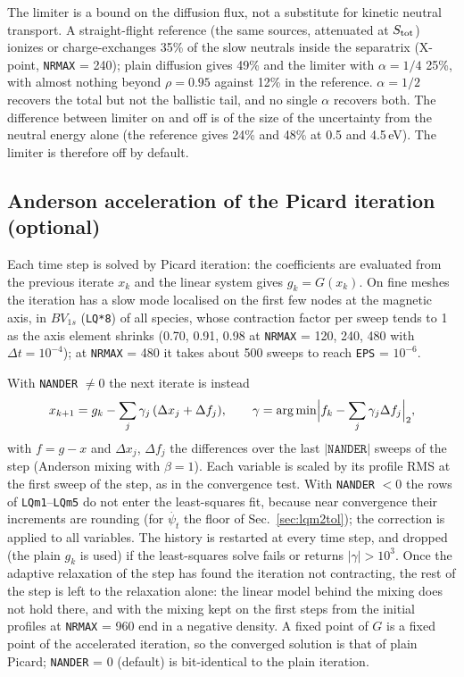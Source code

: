 \documentclass[11pt]{article}
\def\r#1{{\rm#1}}
\def\psit{\psi_t}
\def\psitd{\dot{\psit}}
\begin{document}
The limiter is a bound on the diffusion flux, not a substitute for kinetic
neutral transport.  A straight-flight reference (the same sources, attenuated at
$S_\r{tot}$) ionizes or charge-exchanges 35\% of the slow neutrals inside the
separatrix (X-point, \texttt{NRMAX} = 240); plain diffusion gives 49\% and the limiter
with $\alpha = 1/4$ 25\%, with almost nothing beyond $\rho = 0.95$ against 12\% in the
reference.  $\alpha = 1/2$ recovers the total but not the ballistic tail, and no
single $\alpha$ recovers both.  The difference between limiter on and off is of the
size of the uncertainty from the neutral energy alone (the reference gives 24\%
and 48\% at 0.5 and 4.5\,eV).  The limiter is therefore off by default.

\subsection{Anderson acceleration of the Picard iteration (optional)}
\label{sec:anderson}

Each time step is solved by Picard iteration: the coefficients are evaluated
from the previous iterate $x_k$ and the linear system gives $g_k = G(x_k)$.  On
fine meshes the iteration has a slow mode localised on the first few nodes at
the magnetic axis, in $BV_{1s}$ (\texttt{LQ*8}) of all species, whose contraction
factor per sweep tends to 1 as the axis element shrinks (0.70, 0.91, 0.98 at
\texttt{NRMAX} = 120, 240, 480 with $\Delta t = 10^{-4}$); at \texttt{NRMAX} = 480
it takes about 500 sweeps to reach \texttt{EPS} = $10^{-6}$.

With \texttt{NANDER} $\ne 0$ the next iterate is instead
\[
  x_{k+1} = g_k - \sum_j \gamma_j\,(\Delta x_j + \Delta f_j),\qquad
  \gamma = \arg\min\Bigl|f_k - \sum_j \gamma_j \Delta f_j\Bigr|_2,
\]
with $f = g - x$ and $\Delta x_j$, $\Delta f_j$ the differences over the last
$|\texttt{NANDER}|$ sweeps of the step (Anderson mixing with $\beta = 1$).  Each
variable is scaled by its profile RMS at the first sweep of the step, as in the
convergence test.  With \texttt{NANDER} $< 0$ the rows of \texttt{LQm1}--\texttt{LQm5} do not
enter the least-squares fit, because near convergence their increments are
rounding (for $\psitd$ the floor of Sec.~\ref{sec:lqm2tol}); the correction is
applied to all variables.  The history
is restarted at every time step, and dropped (the plain $g_k$ is used) if the
least-squares solve fails or returns $|\gamma| > 10^3$.  Once the adaptive
relaxation of the step has found the iteration not contracting, the rest of the
step is left to the relaxation alone: the linear model behind the mixing does not
hold there, and with the mixing kept on the first steps from the initial profiles
at \texttt{NRMAX} = 960 end in a negative density.  A fixed point of $G$ is
a fixed point of the accelerated iteration, so the converged solution is that of
plain Picard; \texttt{NANDER} = 0 (default) is bit-identical to the plain iteration.
\end{document}
